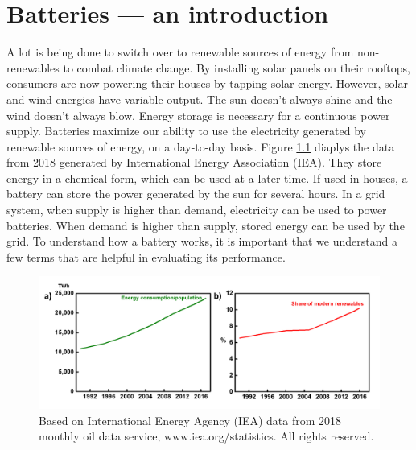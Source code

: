 \chapter{Batteries --- an introduction} %
 \label{chap1} %
\newcommand{\keyword}[1]{\textbf{#1}}
\newcommand{\tabhead}[1]{\textbf{#1}}
\newcommand{\code}[1]{\texttt{#1}}
\newcommand{\file}[1]{\texttt{\bfseries#1}}
\newcommand{\option}[1]{\texttt{\itshape#1}}

A lot is being done to switch over to renewable sources of energy from non-renewables to combat climate change. By installing solar panels on their rooftops, consumers are now powering their houses by tapping solar energy. However, solar and wind energies have variable output. The sun doesn't always shine and the wind doesn't always blow. Energy storage is necessary for a continuous power supply. Batteries maximize our ability to use the electricity generated by renewable sources of energy, on a day-to-day basis. Figure \ref{Figures/chap1fig:IEC2} diaplys the data from 2018 generated by International Energy Association (IEA). They store energy in a chemical form, which can be used at a later time. If used in houses, a battery can store the power generated by the sun for several hours. In a grid system, when supply is higher than demand, electricity can be used to power batteries. When demand is higher than supply, stored energy can be used by the grid. To understand how a battery works, it is important that we understand a few terms that are helpful in evaluating its performance. 

\begin{figure}[tbh!]
\centering
\includegraphics[width=\textwidth]{Figures/chap1fig/IEC2}
\caption{Based on International Energy Agency (IEA) data from 2018 monthly oil data service, www.iea.org/statistics. All rights reserved.}
\label{Figures/chap1fig:IEC2}
\end{figure}

